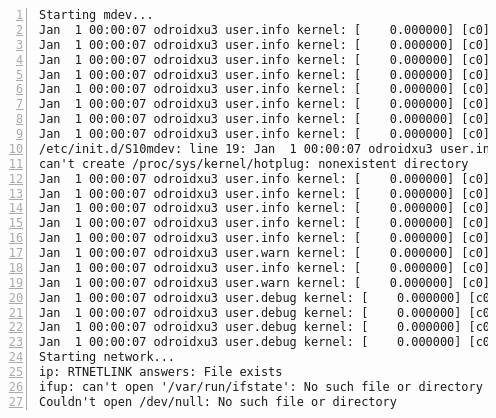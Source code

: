 \begin{lstlisting}[numbers=left]
Starting mdev...
Jan  1 00:00:07 odroidxu3 user.info kernel: [    0.000000] [c0] ION: Contiguous 0x400000 bytes @ 0x0 defined for 9:sectbl
Jan  1 00:00:07 odroidxu3 user.info kernel: [    0.000000] [c0] ION: Contiguous 0x400000 bytes @ 0x0 defined for 8:mfc_fw
Jan  1 00:00:07 odroidxu3 user.info kernel: [    0.000000] [c0] ION: Contiguous 0x400000 bytes @ 0x0 defined for 12:mfc_nfw
Jan  1 00:00:07 odroidxu3 user.info kernel: [    0.000000] [c0] ION: Contiguous 0x400000 bytes @ 0x0 defined for 13:secdma
Jan  1 00:00:07 odroidxu3 user.info kernel: [    0.000000] [c0] cma: CMA: reserved 104 MiB at b8000000
Jan  1 00:00:07 odroidxu3 user.info kernel: [    0.000000] [c0] cma: CMA: reserved 4 MiB at b7c00000
Jan  1 00:00:07 odroidxu3 user.info kernel: [    0.000000] [c0] cma: CMA: reserved 8 MiB at b7400000
Jan  1 00:00:07 odroidxu3 user.info kernel: [    0.000000] [c0] cma: CMA: reserved 96 MiB at b1400000
/etc/init.d/S10mdev: line 19: Jan  1 00:00:07 odroidxu3 user.info kernel: [    0.000000] [c0] cma: CMA: reserved 16 MiB at b0400000
can't create /proc/sys/kernel/hotplug: nonexistent directory
Jan  1 00:00:07 odroidxu3 user.info kernel: [    0.000000] [c0] cma: CMA: reserved 4 MiB at b0000000
Jan  1 00:00:07 odroidxu3 user.info kernel: [    0.000000] [c0] cma: CMA: reserved 4 MiB at afc00000
Jan  1 00:00:07 odroidxu3 user.info kernel: [    0.000000] [c0] cma: CMA: reserved 4 MiB at af800000
Jan  1 00:00:07 odroidxu3 user.info kernel: [    0.000000] [c0] cma: CMA: reserved 4 MiB at af400000
Jan  1 00:00:07 odroidxu3 user.info kernel: [    0.000000] [c0] cma: CMA: reserved 256 MiB at 5f800000
Jan  1 00:00:07 odroidxu3 user.warn kernel: [    0.000000] [c0] Memory policy: ECC disabled, Data cache writealloc
Jan  1 00:00:07 odroidxu3 user.info kernel: [    0.000000] [c0] create_mapping_memory: section: 40000000 ~ 6f800000
Jan  1 00:00:07 odroidxu3 user.warn kernel: [    0.000000] [c0] CPU EXYNOS5422 (id 0xe5422001)
Jan  1 00:00:07 odroidxu3 user.debug kernel: [    0.000000] [c0] On node 0 totalpages: 518656
Jan  1 00:00:07 odroidxu3 user.debug kernel: [    0.000000] [c0] free_area_init_node: node 0, pgdat c097ab80, node_mem_map c0de2000
Jan  1 00:00:07 odroidxu3 user.debug kernel: [    0.000000] [c0]   Normal zone: 1520 pages used for memmap
Jan  1 00:00:07 odroidxu3 user.debug kernel: [    0.000000] [c0]   Normal zone: 0 pages reserJan  1 00:00:0Jan  1 00:00:0Jan  1 00:00:0Jan  1 00:00:0Jan  1 00:00:0mdev: /sys/class: No such file or directory
Starting network...
ip: RTNETLINK answers: File exists
ifup: can't open '/var/run/ifstate': No such file or directory
Couldn't open /dev/null: No such file or directory

\end{lstlisting}
